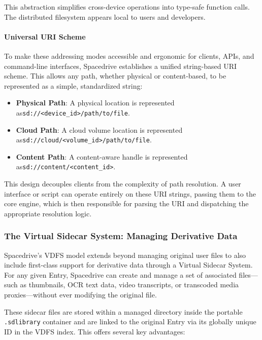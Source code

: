 \documentclass[sigconf]{acmart}
\begin{document}
This abstraction simplifies cross-device operations into type-safe function calls. The distributed filesystem appears local to users and developers.

\paragraph{Universal URI Scheme}
To make these addressing modes accessible and ergonomic for clients, APIs, and command-line interfaces, Spacedrive establishes a unified string-based URI scheme. This allows any path, whether physical or content-based, to be represented as a simple, standardized string:
\begin{itemize}[noitemsep, topsep=0pt]
    \item \textbf{Physical Path}: A physical location is represented as\newline \texttt{sd://\textless{}device\_id\textgreater{}/path/to/file}.
    \item \textbf{Cloud Path}: A cloud volume location is represented as\newline \texttt{sd://cloud/\textless{}volume\_id\textgreater{}/path/to/file}.
    \item \textbf{Content Path}: A content-aware handle is represented as\newline \texttt{sd://content/\textless{}content\_id\textgreater{}}.
\end{itemize}
This design decouples clients from the complexity of path resolution. A user interface or script can operate entirely on these URI strings, passing them to the core engine, which is then responsible for parsing the URI and dispatching the appropriate resolution logic.


\subsubsection{The Virtual Sidecar System: Managing Derivative Data}
Spacedrive's VDFS model extends beyond managing original user files to also include first-class support for derivative data through a Virtual Sidecar System. For any given Entry, Spacedrive can create and manage a set of associated files—such as thumbnails, OCR text data, video transcripts, or transcoded media proxies—without ever modifying the original file.

These sidecar files are stored within a managed directory inside the portable \texttt{.sdlibrary} container and are linked to the original Entry via its globally unique ID in the VDFS index. This offers several key advantages:
\end{document}
